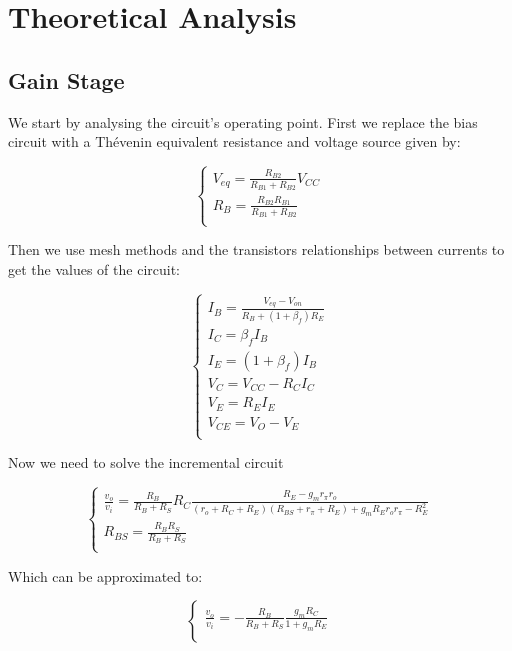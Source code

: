 \section{Theoretical Analysis}
\label{sec:analysis}

\subsection{Gain Stage}
We start by analysing the circuit's operating point.
First we replace the bias circuit with a Thévenin equivalent resistance and voltage source given by:

\begin{equation}\label{eq:v_eq}
\begin{cases}
V_{eq}=\frac{R_{B2}}{R_{B1}+R_{B2}} V_{CC} \\
R_B=\frac{R_{B2}R_{B1}}{R_{B1}+R_{B2}}\\
\end{cases}
\end{equation}

Then we use mesh methods and the transistors relationships between currents to get the values of the circuit:

\begin{equation}\label{eq:v_eq}
\begin{cases}
I_B=\frac{V_{eq}-V_{on}}{R_B+(1+\beta_f)R_{E}}\\
I_C=\beta_f I_B\\
I_E=(1+\beta_f)I_B\\
V_C=V_{CC}-R_C I_C\\
V_E=R_E I_E\\
V_{CE}=V_O-V_E\\
\end{cases}
\end{equation}

Now we need to solve the incremental circuit

\begin{equation}\label{eq:v_eq}
\begin{cases}
\frac{v_o}{v_i}=\frac{R_B}{R_B+R_S} R_C \frac{R_E-g_m r_\pi r_o}{(r_o+R_C+R_E)(R_{BS}+r_\pi+R_E)+g_m R_E r_o r_\pi - R_E^2}\\
R_{BS}=\frac{R_B R_S}{R_B+R_S}\\
\end{cases}
\end{equation}

Which can be approximated to:

\begin{equation}\label{eq:v_eq}
\begin{cases}
\frac{v_o}{v_i}=-\frac{R_B}{R_B+R_S} \frac{g_m R_C}{1+g_m R_E}\\
\end{cases}
\end{equation}

